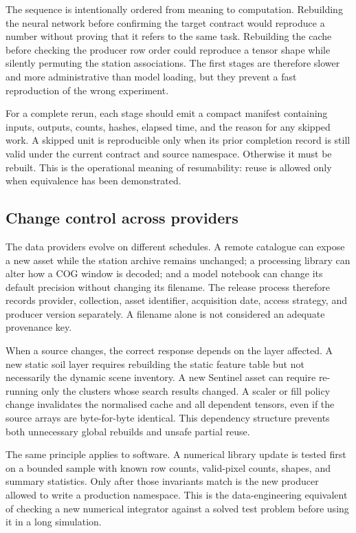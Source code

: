 \documentclass[12pt,a4paper]{report}
\begin{document}
The sequence is intentionally ordered from meaning to computation. Rebuilding
the neural network before confirming the target contract would reproduce a
number without proving that it refers to the same task. Rebuilding the cache
before checking the producer row order could reproduce a tensor shape while
silently permuting the station associations. The first stages are therefore
slower and more administrative than model loading, but they prevent a fast
reproduction of the wrong experiment.

For a complete rerun, each stage should emit a compact manifest containing
inputs, outputs, counts, hashes, elapsed time, and the reason for any skipped
work. A skipped unit is reproducible only when its prior completion record is
still valid under the current contract and source namespace. Otherwise it must
be rebuilt. This is the operational meaning of resumability: reuse is allowed
only when equivalence has been demonstrated.

\subsection{Change control across providers}
The data providers evolve on different schedules. A remote catalogue can expose
a new asset while the station archive remains unchanged; a processing library
can alter how a COG window is decoded; and a model notebook can change its
default precision without changing its filename. The release process therefore
records provider, collection, asset identifier, acquisition date, access
strategy, and producer version separately. A filename alone is not considered
an adequate provenance key.

When a source changes, the correct response depends on the layer affected. A
new static soil layer requires rebuilding the static feature table but not
necessarily the dynamic scene inventory. A new Sentinel asset can require
re-running only the clusters whose search results changed. A scaler or fill
policy change invalidates the normalised cache and all dependent tensors, even
if the source arrays are byte-for-byte identical. This dependency structure
prevents both unnecessary global rebuilds and unsafe partial reuse.

The same principle applies to software. A numerical library update is tested
first on a bounded sample with known row counts, valid-pixel counts, shapes,
and summary statistics. Only after those invariants match is the new producer
allowed to write a production namespace. This is the data-engineering
equivalent of checking a new numerical integrator against a solved test
problem before using it in a long simulation.
\end{document}
